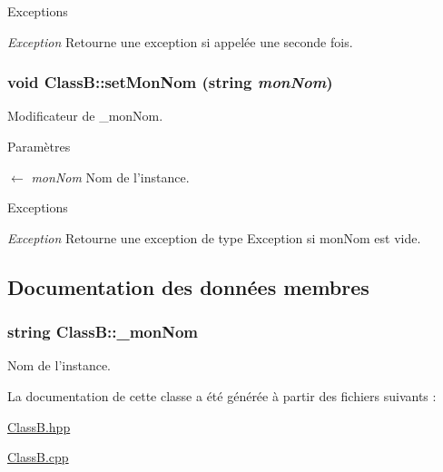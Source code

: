 \begin{DoxyExceptions}{Exceptions}
\item[{\em Exception}]Retourne une exception si appelée une seconde fois. \end{DoxyExceptions}
\hypertarget{class_class_b_a8294ff99ed4904787e47ca15f07e2ace}{
\subsubsection[{setMonNom}]{\setlength{\rightskip}{0pt plus 5cm}void ClassB::setMonNom (string {\em monNom})}}
\label{class_class_b_a8294ff99ed4904787e47ca15f07e2ace}


Modificateur de \_\-monNom. 
\begin{DoxyParams}{Paramètres}
\item[\mbox{$\leftarrow$} {\em monNom}]Nom de l'instance.\end{DoxyParams}

\begin{DoxyExceptions}{Exceptions}
\item[{\em Exception}]Retourne une exception de type Exception si monNom est vide. \end{DoxyExceptions}


\subsection{Documentation des données membres}
\hypertarget{class_class_b_a1014a29d4201c63e8ebd40c027eb2fc7}{
\subsubsection[{\_\-monNom}]{\setlength{\rightskip}{0pt plus 5cm}string {\bf ClassB::\_\-monNom}}}
\label{class_class_b_a1014a29d4201c63e8ebd40c027eb2fc7}


Nom de l'instance. 

La documentation de cette classe a été générée à partir des fichiers suivants :\begin{DoxyCompactItemize}
\item 
\hyperlink{_class_b_8hpp}{ClassB.hpp}\item 
\hyperlink{_class_b_8cpp}{ClassB.cpp}\end{DoxyCompactItemize}
